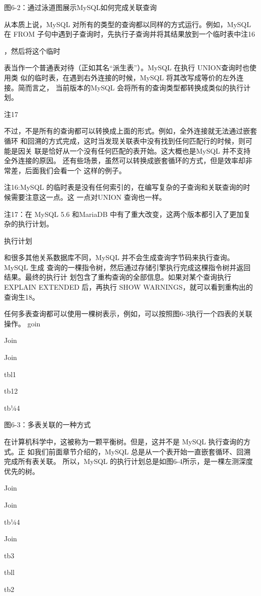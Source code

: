 图6-2：通过泳道图展示MySQL如何完成关联查询

从本质上说，MySQL 对所有的类型的查询都以同样的方式运行。例如，MySQL 在 FROM
子句中遇到子查询时，先执行子查询并将其结果放到一个临时表中注16

，然后将这个临时

表当作一个普通表对待（正如其名“派生表”）。MySQL 在执行 UNION查询时也使用类
似的临时表，在遇到右外连接的时候，MySQL 将其改写成等价的左外连接。简而言之，
当前版本的MySQL 会将所有的查询类型都转换成类似的执行计划。

注17

不过，不是所有的查询都可以转换成上面的形式。例如，全外连接就无法通过嵌套循环
和回溯的方式完成，这时当发现关联表中没有找到任何匹配行的时候，则可能是因关
联是恰好从一个没有任何匹配的表开始。这大概也是MySQL 并不支持全外连接的原因。
还有些场景，虽然可以转换成嵌套循环的方式，但是效率却非常差，后面我们会看一个
这样的例子。

注16:MySQL 的临时表是没有任何索引的，在编写复杂的子查询和关联查询的时候需要注意这一点。这
一点对UNION 查询也一样。

注17：在 MySQL 5.6 和MariaDB 中有了重大改变，这两个版本都引入了更加复杂的执行计划。

执行计划

和很多其他关系数据库不同，MySQL 并不会生成查询字节码来执行查询。MySQL 生成
查询的一棵指令树，然后通过存储引擎执行完成这棵指令树并返回结果。最终的执行计
划包含了重构查询的全部信息。如果对某个查询执行 EXPLAIN EXTENDED 后，再执行 SHOW
WARNINGS，就可以看到重构出的查询生18。

任何多表查询都可以使用一棵树表示，例如，可以按照图6-3执行一个四表的关联操作。
goin

Join

Join

tbl1

tb12

tb¼4

图6-3：多表关联的一种方式

在计算机科学中，这被称为一颗平衡树。但是，这并不是 MySQL 执行查询的方式。正
如我们前面章节介绍的，MySQL 总是从一个表开始一直嵌套循环、回溯完成所有表关联。
所以，MySQL 的执行计划总是如图6-4所示，是一棵左测深度优先的树。

Join

Join

tb¼4

Join

tb3

tbll

tb2

